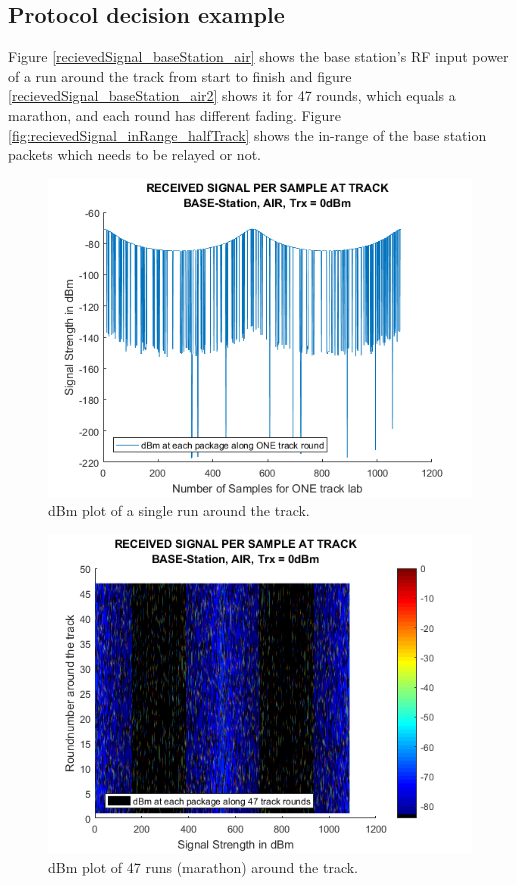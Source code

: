\subsection{Protocol decision example}\label{sc:protocolDecisionExample}
Figure \ref{recievedSignal_baseStation_air} shows the base station's RF input power of a run around the track from start to finish and figure \ref{recievedSignal_baseStation_air2} shows it for 47 rounds, which equals a marathon, and each round has different fading. Figure \ref{fig:recievedSignal_inRange_halfTrack} shows the in-range of the base station packets which needs to be relayed or not.

\begin{figure}[h]
	\centering
	\includegraphics[width=\linewidth]{theory/protocolDecisionExample/fig/recievedSignal_baseStation_air.png}
	\caption{dBm plot of a single run around the track.}
	\label{fig:recievedSignal_baseStation_air}
\end{figure}

\begin{figure}[h]
	\centering
	\includegraphics[width=\linewidth]{theory/protocolDecisionExample/fig/recievedSignal_baseStation_air2.png}
	\caption{dBm plot of 47 runs (marathon) around the track.}
	\label{fig:recievedSignal_baseStation_air2}
\end{figure}

